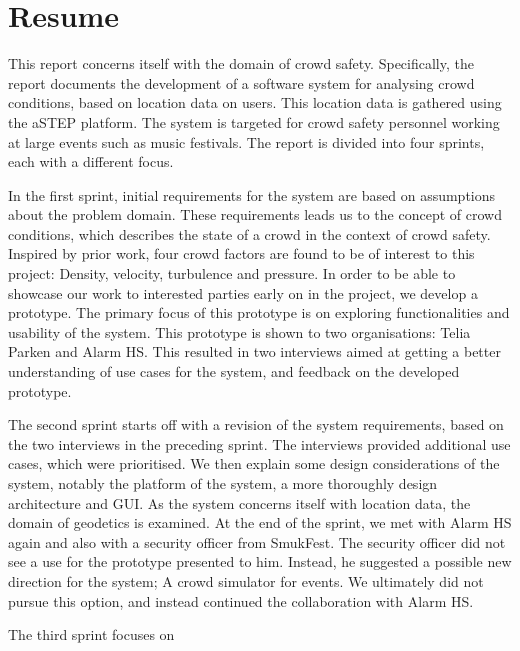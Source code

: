 \chapter*{Resume}

This report concerns itself with the domain of crowd safety. Specifically, the report documents the development of a software system for analysing crowd conditions, based on location data on users. This location data is gathered using the aSTEP platform. The system is targeted for crowd safety personnel working at large events such as music festivals. The report is divided into four sprints, each with a different focus.

In the first sprint, initial requirements for the system are based on assumptions about the problem domain. These requirements leads us to the concept of crowd conditions, which describes the state of a crowd in the context of crowd safety. Inspired by prior work, four crowd factors are found to be of interest to this project: Density, velocity, turbulence and pressure. In order to be able to showcase our work to interested parties early on in the project, we develop a prototype. The primary focus of this prototype is on exploring functionalities and usability of the system. This prototype is shown to two organisations: Telia Parken and Alarm HS. This resulted in two interviews aimed at getting a better understanding of use cases for the system, and feedback on the developed prototype.

The second sprint starts off with a revision of the system requirements, based on the two interviews in the preceding sprint. The interviews provided additional use cases, which were prioritised. We then explain some design considerations of the system, notably the platform of the system, a more thoroughly design architecture and GUI. As the system concerns itself with location data, the domain of geodetics is examined. At the end of the sprint, we met with Alarm HS again and also with a security officer from SmukFest. The security officer did not see a use for the prototype presented to him. Instead, he suggested a possible new direction for the system; A crowd simulator for events. We ultimately did not pursue this option, and instead continued the collaboration with Alarm HS.

The third sprint focuses on 